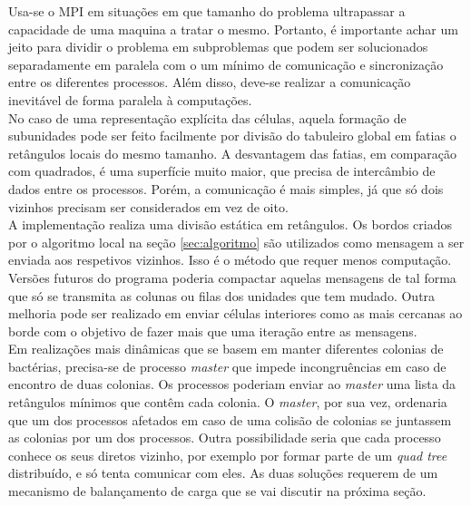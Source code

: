 \label{sec:distribuicao}

Usa-se o MPI em situações em que tamanho do problema ultrapassar a capacidade de uma maquina a tratar o mesmo. Portanto, é importante achar um jeito para dividir o problema em subproblemas que podem ser solucionados separadamente em paralela com o um mínimo de comunicação e sincronização entre os diferentes processos. Além disso, deve-se realizar a comunicação inevitável de forma paralela à computações. \\

No caso de uma representação explícita das células, aquela formação de subunidades pode ser feito facilmente por divisão do tabuleiro global em fatias o retângulos locais do mesmo tamanho. A desvantagem das fatias, em comparação com quadrados, é uma superfície muito maior, que precisa de intercâmbio de dados entre os processos. Porém, a comunicação é mais simples, já que só dois vizinhos precisam ser considerados em vez de oito.\\

A implementação realiza uma divisão estática em retângulos. Os bordos criados por o algoritmo local na seção \ref{sec:algoritmo} são utilizados como mensagem a ser enviada aos respetivos vizinhos. Isso é o método que requer menos computação. Versões futuros do programa poderia compactar aquelas mensagens de tal forma que só se transmita as colunas ou filas dos unidades que tem mudado. Outra melhoria pode ser realizado em enviar células interiores como as mais cercanas ao borde com o objetivo de fazer mais que uma iteração entre as mensagens.\\

Em realizações mais dinâmicas que se basem em manter diferentes colonias de bactérias, precisa-se de processo \textit{master} que impede incongruências em caso de encontro de duas colonias. Os processos poderiam enviar ao \textit{master} uma lista da retângulos mínimos que contêm cada colonia. O \textit{master}, por sua vez, ordenaria que um dos processos afetados em caso de uma colisão de colonias se juntassem as colonias por um dos processos. Outra possibilidade seria que cada processo conhece os seus diretos vizinho, por exemplo por formar parte de um \textit{quad tree} distribuído, e só tenta comunicar com eles. As duas soluções requerem de um mecanismo de balançamento de carga que se vai discutir na próxima seção.

